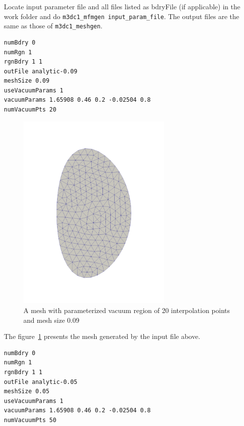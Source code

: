Locate input parameter file and all files listed as bdryFile (if applicable) in the work folder and do \texttt{m3dc1\_mfmgen input\_param\_file}. The output files are the same as those of \texttt{m3dc1\_meshgen}.

\begin{verbatim}
numBdry 0
numRgn 1
rgnBdry 1 1
outFile analytic-0.09
meshSize 0.09
useVacuumParams 1
vacuumParams 1.65908 0.46 0.2 -0.02504 0.8
numVacuumPts 20
\end{verbatim}

\begin{figure}
\centering
\includegraphics[width=3in]{./figures/meshgen-analytic-20pts-09.pdf}
\caption[Mesh with parameterized vacuum region I]
{A mesh with parameterized vacuum region of 20 interpolation points and mesh size 0.09}
\label{fig:analytic-mesh-1}
\end{figure}

The figure~\ref{fig:analytic-mesh-1} presents the mesh generated by the input file above.

\begin{verbatim}
numBdry 0
numRgn 1
rgnBdry 1 1
outFile analytic-0.05
meshSize 0.05
useVacuumParams 1
vacuumParams 1.65908 0.46 0.2 -0.02504 0.8
numVacuumPts 50
\end{verbatim}

